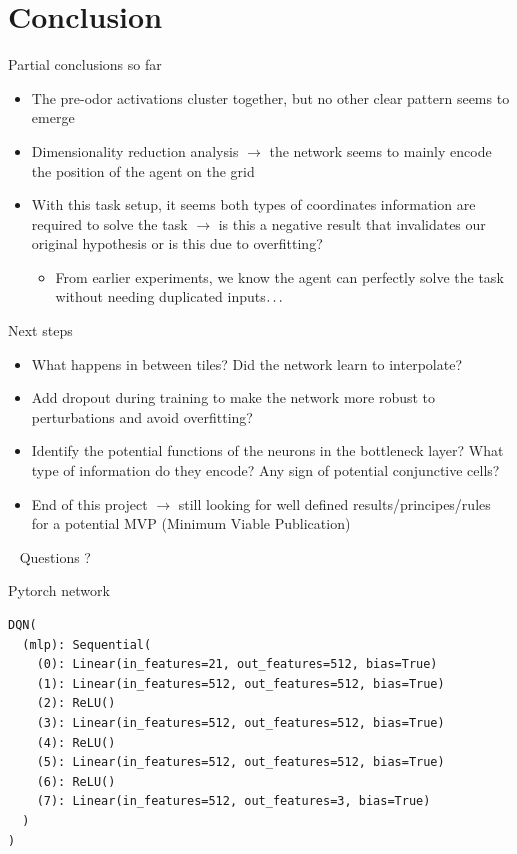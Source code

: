 \documentclass[bigger]{beamer}
\begin{document}
\section{Conclusion}
\label{sec:org66bca22}
\begin{frame}[<+->][label={sec:org55e3f32}]{Partial conclusions so far}
\begin{itemize}
\item The \alert{pre-odor activations} cluster together, but no other clear pattern seems to emerge
\item Dimensionality reduction analysis \(\to\) the network seems to mainly encode the \alert{position of the agent on the grid}
\item With this task setup, it seems \alert{both types of coordinates information are required} to solve the task \(\to\) is this a negative result that invalidates our original hypothesis or is this due to overfitting?
\begin{itemize}
\item From earlier experiments, we know the agent can perfectly solve the task without needing duplicated inputs\(\text{\dots}\)
\end{itemize}
\end{itemize}
\end{frame}
\begin{frame}[<+->][label={sec:org964d3f9}]{Next steps}
\begin{itemize}
\item What happens in between tiles? Did the network learn to interpolate?
\item Add dropout during training to make the network more robust to perturbations and avoid overfitting?
\item Identify the potential functions of the neurons in the bottleneck layer? What type of information do they encode? Any sign of potential conjunctive cells?
\item End of this project \(\to\) still looking for well defined results/principes/rules for a potential MVP (Minimum Viable Publication)
\end{itemize}
\end{frame}
\begin{frame}[label={sec:orgd42eafa},standout]{~}
Questions ?
\end{frame}
\appendix
\begin{frame}[fragile]{Pytorch network}
\addtocounter{framenumber}{-1}
\scriptsize
\begin{lstlisting}
DQN(
  (mlp): Sequential(
    (0): Linear(in_features=21, out_features=512, bias=True)
    (1): Linear(in_features=512, out_features=512, bias=True)
    (2): ReLU()
    (3): Linear(in_features=512, out_features=512, bias=True)
    (4): ReLU()
    (5): Linear(in_features=512, out_features=512, bias=True)
    (6): ReLU()
    (7): Linear(in_features=512, out_features=3, bias=True)
  )
)
\end{lstlisting}
\end{frame}
\end{document}
